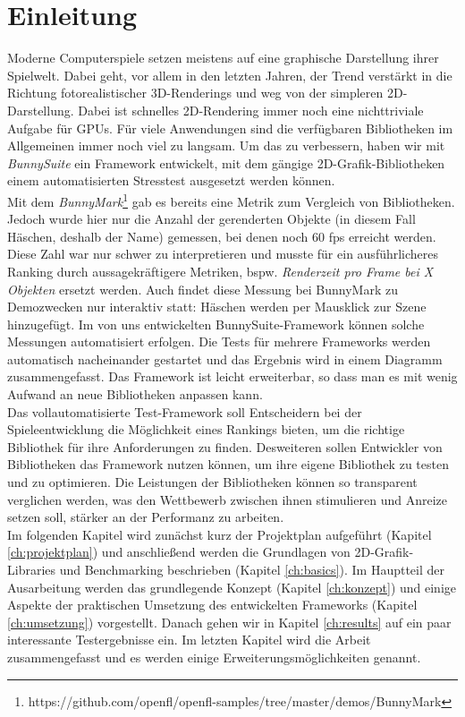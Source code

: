 \chapter{Einleitung}
Moderne Computerspiele setzen meistens auf eine graphische Darstellung ihrer Spielwelt. Dabei geht, vor allem in den letzten Jahren, der Trend verstärkt in die Richtung fotorealistischer 3D-Renderings und weg von der simpleren 2D-Darstellung.
Dabei ist schnelles 2D-Rendering immer noch eine nichttriviale Aufgabe für GPUs. Für viele Anwendungen sind die verfügbaren Bibliotheken im Allgemeinen immer noch viel zu langsam. Um das zu verbessern, haben wir mit \textit{BunnySuite} ein Framework entwickelt, mit dem gängige 2D-Grafik-Bibliotheken einem automatisierten Stresstest ausgesetzt werden können.\\
Mit dem \textit{BunnyMark}\footnote{https://github.com/openfl/openfl-samples/tree/master/demos/BunnyMark} gab es bereits eine Metrik zum Vergleich von Bibliotheken. Jedoch wurde hier nur die Anzahl der gerenderten Objekte (in diesem Fall Häschen, deshalb der Name) gemessen, bei denen noch 60 fps erreicht werden. Diese Zahl war nur schwer zu interpretieren und musste für ein ausführlicheres Ranking durch aussagekräftigere Metriken, bspw. \textit{Renderzeit pro Frame bei X Objekten} ersetzt werden. Auch findet diese Messung bei BunnyMark zu Demozwecken nur interaktiv statt: Häschen werden per Mausklick zur Szene hinzugefügt. Im von uns entwickelten BunnySuite-Framework können solche Messungen automatisiert erfolgen. Die Tests für mehrere Frameworks werden automatisch nacheinander gestartet und das Ergebnis wird in einem Diagramm zusammengefasst. Das Framework ist leicht erweiterbar, so dass man es mit wenig Aufwand an neue Bibliotheken anpassen kann.\\
Das vollautomatisierte Test-Framework soll Entscheidern bei der Spieleentwicklung die Möglichkeit eines Rankings bieten, um die richtige Bibliothek für ihre Anforderungen zu finden. Desweiteren sollen Entwickler von Bibliotheken das Framework nutzen können, um ihre eigene Bibliothek zu testen und zu optimieren. Die Leistungen der Bibliotheken können so transparent verglichen werden, was den Wettbewerb zwischen ihnen stimulieren und Anreize setzen soll, stärker an der Performanz zu arbeiten.\\
Im folgenden Kapitel wird zunächst kurz der Projektplan aufgeführt (Kapitel \ref{ch:projektplan}) und anschließend werden die Grundlagen von 2D-Grafik-Libraries und Benchmarking beschrieben (Kapitel \ref{ch:basics}). Im Hauptteil der Ausarbeitung werden das grundlegende Konzept (Kapitel \ref{ch:konzept}) und einige Aspekte der praktischen Umsetzung des entwickelten Frameworks (Kapitel \ref{ch:umsetzung}) vorgestellt. Danach gehen wir in Kapitel \ref{ch:results} auf ein paar interessante Testergebnisse ein. Im letzten Kapitel wird die Arbeit zusammengefasst und es werden einige Erweiterungsmöglichkeiten genannt.

